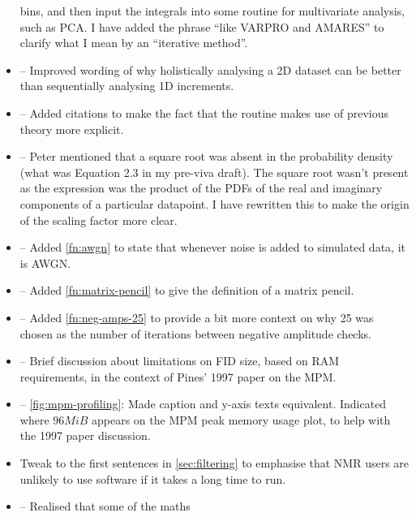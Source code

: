 \documentclass[12pt]{article}
\begin{document}
\begin{itemize}
            bins, and then input the integrals into some routine for multivariate
            analysis, such as PCA. I have added the phrase ``like VARPRO and
            AMARES'' to clarify what I mean by an ``iterative method''.
        \item {} -- Improved wording of why holistically
            analysing a 2D dataset can be better than sequentially analysing 1D
            increments.
        \item {} -- Added citations to make the fact
            that the routine makes use of previous theory more explicit.
        \item {} -- Peter mentioned that a square
            root was absent in the probability density (what was Equation 2.3
            in my pre-viva draft). The square root wasn't present as the
            expression was the product of the PDFs of the real and imaginary
            components of a particular datapoint. I have rewritten this to make
            the origin of the scaling factor more clear.
        \item {} -- Added \cref{fn:awgn} to state that whenever
            noise is added to simulated data, it is AWGN.
        \item {} -- Added \cref{fn:matrix-pencil} to
            give the definition of a matrix pencil.
        \item {} -- Added \cref{fn:neg-amps-25} to
            provide a bit more context on why 25 was chosen as the number of
            iterations between negative amplitude checks.
        \item {} -- Brief discussion about limitations
            on FID size, based on RAM requirements, in the context of Pines'
            1997 paper on the MPM.
        \item {} -- \cref{fig:mpm-profiling}: Made
            caption and y-axis texts equivalent. Indicated where $96MiB$
            appears on the MPM peak memory usage plot, to help with the 1997
            paper discussion.
        \item {} Tweak to the first sentences in
            \cref{sec:filtering} to emphasise that NMR users are unlikely to
            use software if it takes a long time to run.
        \item {} -- Realised that some of the maths

\end{itemize}
\end{document}
